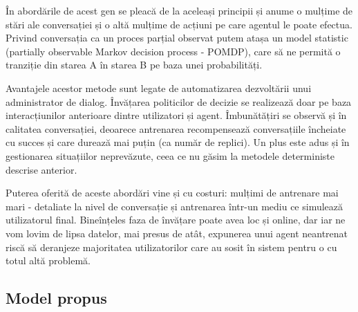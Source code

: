 În abordările de acest gen se pleacă de la aceleași principii și anume o mulțime de stări ale conversației și o altă mulțime de acțiuni pe care agentul le poate efectua. Privind conversația ca un proces parțial observat putem atașa un model statistic (partially observable Markov decision process - POMDP), care să ne permită o tranziție din starea A în starea B pe baza unei probabilități.

Avantajele acestor metode sunt legate de automatizarea dezvoltării unui administrator de dialog. Învățarea politicilor de decizie se realizează doar pe baza interacțiunilor anterioare dintre utilizatori și agent. Îmbunătățiri se observă și în calitatea conversației, deoarece antrenarea recompensează conversațiile încheiate cu succes și care durează mai puțin (ca număr de replici). Un plus este adus și în gestionarea situațiilor neprevăzute, ceea ce nu găsim la metodele deterministe descrise anterior.

Puterea oferită de aceste abordări vine și cu costuri: mulțimi de antrenare mai mari - detaliate la nivel de conversație și antrenarea într-un mediu ce simulează utilizatorul final. Bineînțeles faza de învățare poate avea loc și online, dar iar ne vom lovim de lipsa datelor, mai presus de atât, expunerea unui agent neantrenat riscă să deranjeze majoritatea utilizatorilor care au sosit în sistem pentru o cu totul altă problemă.

\subsection{Model propus}

